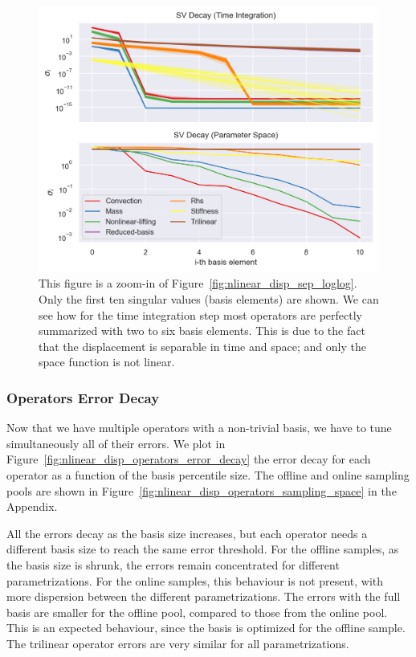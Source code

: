 \documentclass[../../thesis.tex]{subfiles}
\begin{document}
\begin{figure}[h]
    \includegraphics[width =\columnwidth]{research_project/piston/figures/nonlinear_displacement/separable/sigmas_logy.png}
    \caption{This figure is a zoom-in of Figure~\ref{fig:nlinear_disp_sep_loglog}.
    Only the first ten singular values (basis elements) are shown.
    We can see how for the time integration step most operators 
    are perfectly summarized with two to six basis elements.
    This is due to the fact that the displacement is separable in time and space;
    and only the space function is not linear.}
    \label{fig:nlinear_disp_sep_logy}
\end{figure}

\subsubsection{Operators Error Decay}
Now that we have multiple operators with a non-trivial basis, 
we have to tune simultaneously all of their errors.
We plot in Figure~\ref{fig:nlinear_disp_operators_error_decay}
the error decay for each operator as a function of the basis percentile size.
The offline and online sampling pools are shown in
Figure~\ref{fig:nlinear_disp_operators_sampling_space} in the Appendix.

All the errors decay as the basis size increases, 
but each operator needs a different basis size to reach the same error threshold.
For the offline samples, as the basis size is shrunk, 
the errors remain concentrated for different parametrizations.
For the online samples, this behaviour is not present, 
with more dispersion between the different parametrizations.
The errors with the full basis are smaller for the offline pool, 
compared to those from the online pool.
This is an expected behaviour, 
since the basis is optimized for the offline sample.
The trilinear operator errors are very similar for all parametrizations.
\end{document}
